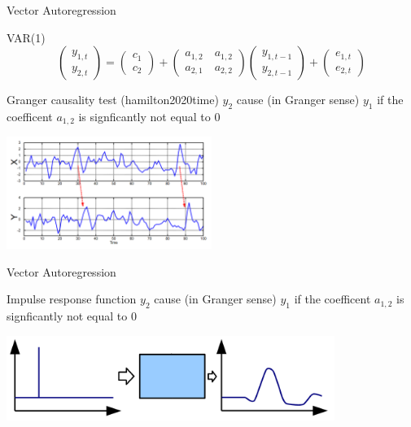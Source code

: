 \documentclass[11pt]{beamer}
\begin{document}
\begin{frame}{Vector Autoregression \cite{hamilton2020time}}
\begin{alertblock}{VAR(1)}
\begin{equation*}
\begin{pmatrix} y_{1,t} \\ y_{2,t} \end{pmatrix} = \begin{pmatrix} c_{1} \\ c_{2} \end{pmatrix} + \begin{pmatrix} a_{1,2}\quad a_{1,2} \\ a_{2,1} \quad a_{2,2} \end{pmatrix} \begin{pmatrix} y_{1,t-1} \\ y_{2,t-1} \end{pmatrix} +
\begin{pmatrix} e_{1,t} \\ e_{2,t} \end{pmatrix}
\end{equation*}
\end{alertblock}

\begin{alertblock}{Granger causality test (hamilton2020time)}
$y_{2}$ cause (in Granger sense) $y_{1}$ if the coefficent $a_{1,2}$ is signficantly not equal to 0
\begin{center}
     \includegraphics[width=0.5\textwidth]{Pic/granger.png}
    \end{center}
    \end{alertblock}
\end{frame}

\begin{frame}{Vector Autoregression \cite{hamilton2020time}}
\begin{alertblock}{Impulse response function}
$y_{2}$ cause (in Granger sense) $y_{1}$ if the coefficent $a_{1,2}$ is signficantly not equal to 0
\begin{center}
     \includegraphics[width=0.8\textwidth]{Pic/irf.png}
    \end{center}
    \end{alertblock}
\end{frame}
\end{document}
